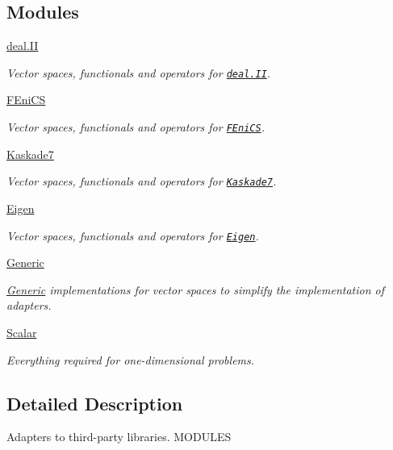 \subsection*{Modules}
\begin{DoxyCompactItemize}
\item 
\hyperlink{group__dealIIGroup}{deal.\-I\-I}
\begin{DoxyCompactList}\small\item\em Vector spaces, functionals and operators for \href{http://www.dealii.org}{\tt deal.\-I\-I}. \end{DoxyCompactList}\item 
\hyperlink{group__FenicsGroup}{F\-Eni\-C\-S}
\begin{DoxyCompactList}\small\item\em Vector spaces, functionals and operators for \href{http://www.fenicsproject.org}{\tt F\-Eni\-C\-S}. \end{DoxyCompactList}\item 
\hyperlink{group__KaskadeGroup}{Kaskade7}
\begin{DoxyCompactList}\small\item\em Vector spaces, functionals and operators for \href{http://www.zib.de/projects/kaskade7-finite-element-toolbox}{\tt Kaskade7}. \end{DoxyCompactList}\item 
\hyperlink{group__EigenGroup}{Eigen}
\begin{DoxyCompactList}\small\item\em Vector spaces, functionals and operators for \href{http://eigen.tuxfamily.org}{\tt Eigen}. \end{DoxyCompactList}\item 
\hyperlink{group__GenericGroup}{Generic}
\begin{DoxyCompactList}\small\item\em \hyperlink{namespaceSpacy_1_1Generic}{Generic} implementations for vector spaces to simplify the implementation of adapters. \end{DoxyCompactList}\item 
\hyperlink{group__ScalarGroup}{Scalar}
\begin{DoxyCompactList}\small\item\em Everything required for one-\/dimensional problems. \end{DoxyCompactList}\end{DoxyCompactItemize}


\subsection{Detailed Description}
Adapters to third-\/party libraries. M\-O\-D\-U\-L\-E\-S 